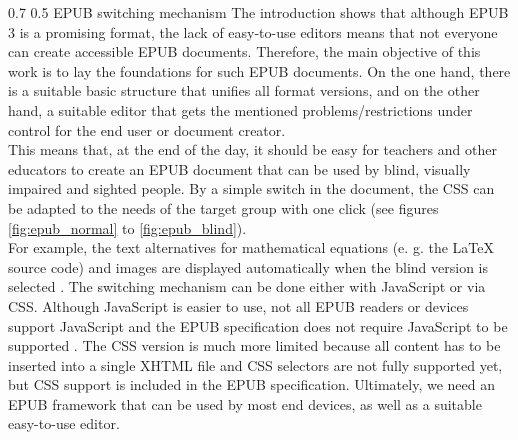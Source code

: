 \documentclass[12pt]{llncs}
\makeatletter
\renewcommand\subsection{\@startsection 
   {subsection}{2}{0mm}%
   {0.7\baselineskip}%
   {0.5\baselineskip}%
   {\bfseries\large}%
   }
\makeatother
\begin{document}
\subsection{EPUB switching mechanism}
The introduction shows that although EPUB 3 is a promising format, the lack of easy-to-use editors means that not everyone can create accessible EPUB documents. Therefore, the main objective of this work is to lay the foundations for such EPUB documents. On the one hand, there is a suitable basic structure that unifies all format versions, and on the other hand, a suitable editor that gets the mentioned problems/restrictions under control for the end user or document creator.\\
This means that, at the end of the day, it should be easy for teachers and other educators to create an EPUB document that can be used by blind, visually impaired and sighted people. By a simple switch in the document, the CSS can be adapted to the needs of the target group with one click (see figures \ref{fig:epub_normal} to \ref{fig:epub_blind}).\\
For example, the text alternatives for mathematical equations (e. g. the \LaTeX $\mbox{ }$ source code) and images are displayed automatically when the blind version is selected \cite{EPUB3bp}. The switching mechanism can be done either with JavaScript or via CSS. Although JavaScript is easier to use, not all EPUB readers or devices support JavaScript and the EPUB specification does not require JavaScript to be supported \cite{EPUB3bp}. The CSS version is much more limited because all content has to be inserted into a single XHTML file and CSS selectors are not fully supported yet, but CSS support is included in the EPUB specification. Ultimately, we need an EPUB framework that can be used by most end devices, as well as a suitable easy-to-use editor.


\end{document}
